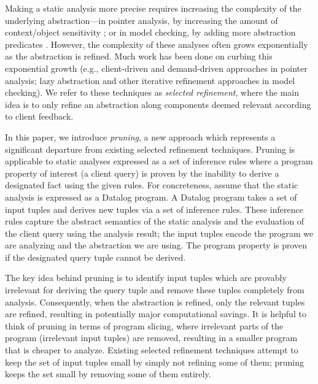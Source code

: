 
Making a static analysis more precise requires increasing the complexity of the
underlying abstraction---in pointer analysis, by increasing the amount of
context/object sensitivity \cite{kcfa, kobj, MilanovaRountevRyder2005,
WhaleyLam2004, LhotakHendren2006, LhotakHendren2008}; or in model checking, by
adding more abstraction predicates \cite{graf97predicate,slam}.
However, the complexity of these analyses often grows exponentially as the
abstraction is refined.
Much work has been done on curbing this exponential growth
(e.g., client-driven \cite{GuyerLin2003} and demand-driven
\cite{HeintzeTardieu2001} approaches in pointer analysis;
lazy abstraction \cite{henzinger02lazy,mcmillan06lazy} and other iterative refinement approaches in model checking).
We refer to these techniques as {\em selected refinement},
where the main idea is to only refine an abstraction along components
deemed relevant according to client feedback.

In this paper, we introduce {\em pruning}, a new approach which represents a
significant departure from existing selected refinement techniques.  Pruning is
applicable to static analyses expressed as a set of inference rules where a
program property of interest (a client query) is proven by the inability to
derive a designated fact using the given rules.  For concreteness, assume that
the static analysis is expressed as a Datalog program.  A Datalog program takes
a set of input tuples and derives new tuples via a set of inference rules.
These inference rules capture the abstract semantics of the static analysis and
the evaluation of the client query using the analysis result; the input tuples encode the program we are
analyzing and the abstraction we are using.  The program property is proven if the
designated query tuple cannot be derived.

The key idea behind pruning is to identify input tuples which are provably
irrelevant for deriving the query tuple and remove these tuples completely from
analysis.  Consequently, when the abstraction is refined, only the relevant
tuples are refined, resulting in potentially major computational savings.  It
is helpful to think of pruning in terms of program slicing, where
irrelevant parts of the program (irrelevant input tuples) are removed,
resulting in a smaller program that is cheaper to analyze.  Existing selected
refinement techniques attempt to keep the set of input tuples small by simply
not refining some of them; pruning keeps the set small by removing some of them
entirely.

